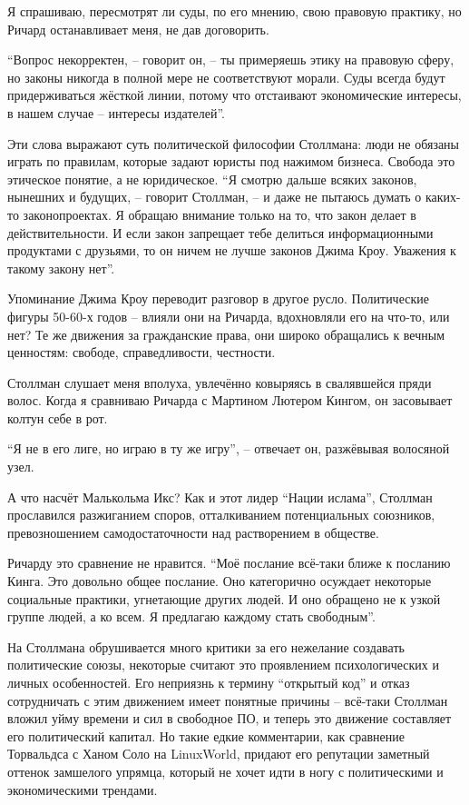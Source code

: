 Я спрашиваю, пересмотрят ли суды, по его мнению, свою правовую практику, но Ричард останавливает меня, не дав договорить.

\enquote{Вопрос некорректен, -- говорит он, -- ты примеряешь этику на правовую сферу, но законы никогда в полной мере не соответствуют морали. Суды всегда будут придерживаться жёсткой линии, потому что отстаивают экономические интересы, в нашем случае -- интересы издателей}.

Эти слова выражают суть политической философии Столлмана: люди не обязаны играть по правилам, которые задают юристы под нажимом бизнеса. Свобода это этическое понятие, а не юридическое. \enquote{Я смотрю дальше всяких законов, нынешних и будущих, -- говорит Столлман, -- и даже не пытаюсь думать о каких-то законопроектах. Я обращаю внимание только на то, что закон делает в действительности. И если закон запрещает тебе делиться информационными продуктами с друзьями, то он ничем не лучше законов Джима Кроу. Уважения к такому закону нет}.

Упоминание Джима Кроу переводит разговор в другое русло. Политические фигуры 50-60-х годов -- влияли они на Ричарда, вдохновляли его на что-то, или нет? Те же движения за гражданские права, они широко обращались к вечным ценностям: свободе, справедливости, честности.

Столлман слушает меня вполуха, увлечённо ковыряясь в свалявшейся пряди волос. Когда я сравниваю Ричарда с Мартином Лютером Кингом, он засовывает колтун себе в рот.

\enquote{Я не в его лиге, но играю в ту же игру}, -- отвечает он, разжёвывая волосяной узел.

А что насчёт Малькольма Икс? Как и этот лидер \enquote{Нации ислама}, Столлман прославился разжиганием споров, отталкиванием потенциальных союзников, превозношением самодостаточности над растворением в обществе.

Ричарду это сравнение не нравится. \enquote{Моё послание всё-таки ближе к посланию Кинга. Это довольно общее послание. Оно категорично осуждает некоторые социальные практики, угнетающие других людей. И оно обращено не к узкой группе людей, а ко всем. Я предлагаю каждому стать свободным}.

На Столлмана обрушивается много критики за его нежелание создавать политические союзы, некоторые считают это проявлением психологических и личных особенностей. Его неприязнь к термину \enquote{открытый код} и отказ сотрудничать с этим движением имеет понятные причины -- всё-таки Столлман вложил уйму времени и сил в свободное ПО, и теперь это движение составляет его политический капитал. Но такие едкие комментарии, как сравнение Торвальдса с Ханом Соло на LinuxWorld, придают его репутации заметный оттенок замшелого упрямца, который не хочет идти в ногу с политическими и экономическими трендами.

